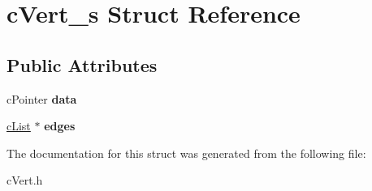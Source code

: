 \hypertarget{structcVert__s}{}\section{c\+Vert\+\_\+s Struct Reference}
\label{structcVert__s}
\subsection*{Public Attributes}
\begin{DoxyCompactItemize}
\item 
\mbox{\label{structcVert__s_aae49e7abf44721e44fd1ab4e1b193576}} 
c\+Pointer {\bfseries data}
\item 
\mbox{\label{structcVert__s_a3fdb83e60774d836ca9d0b92e4672fd6}} 
\mbox{\hyperlink{structcList}{c\+List}} $\ast$ {\bfseries edges}
\end{DoxyCompactItemize}


The documentation for this struct was generated from the following file\+:\begin{DoxyCompactItemize}
\item 
c\+Vert.\+h\end{DoxyCompactItemize}
